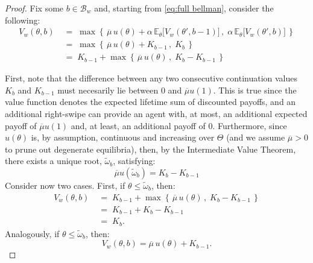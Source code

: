 \begin{proof}
    Fix some $b\in\mathcal{B}_w$ and, starting from \autoref{eq:full bellman}, consider the following:
    \begin{equation*}
        \begin{aligned} 
            V_w(\theta,b) \;&=\;\max\left\{\,\overline{\mu} \, u(\theta) +\alpha \,\mathbb{E}_\theta \Big[V_w(\theta', b-1)\Big]\,,\; \alpha\,\mathbb{E}_\theta \Big[ V_w(\theta', b)\Big]\,\right\}\\
            &=\; \max\left\{\,\overline{\mu} \, u(\theta) + K_{b-1} \,,\; K_b \,\right\}\\
            &=\; K_{b-1} + \max\left\{\,\overline{\mu} \, u(\theta) \,,\; K_b - K_{b-1}\,\right\}
        \end{aligned}
    \end{equation*}
    
    First, note that the difference between any two consecutive continuation values $K_b$ and $K_{b-1}$ must necesarily lie between 0 and $\overline{\mu}u(1)$. 
    This is true since the value function denotes the expected lifetime sum of discounted payoffs, and an additional right-swipe can provide an agent with, at most, an additional expected payoff of $\overline{\mu}u(1)$ and, at least, an additional payoff of $0$.
    Furthermore, since $u(\theta)$ is, by assumption, continuous and increasing over $\Theta$ (and we assume $\overline\mu>0$ to prune out degenerate equilibria), then, by the Intermediate Value Theorem, there exists a unique root, $\widetilde\omega_b$, satisfying:
    \begin{equation*} 
            \overline\mu u(\widetilde\omega_b) = K_b-K_{b-1}   
    \end{equation*}
    Consider now two cases. First, if $\theta\leq\widetilde\omega_b$, then:
    \begin{equation*}
        \begin{aligned} 
            V_w(\theta,b) \;&=\; K_{b-1} + \max\left\{\,\overline{\mu} \, u(\theta) \,,\; K_b - K_{b-1}\,\right\}\\
            &=\; K_{b-1} + K_b - K_{b-1}\\
            &=\; K_b.
        \end{aligned}
    \end{equation*}
    Analogously, if $\theta\leq\widetilde\omega_b$, then:
    \begin{equation*}
        V_w(\theta,b) = \overline{\mu} \, u(\theta) + K_{b-1}. 
    \end{equation*} 


\end{proof}
